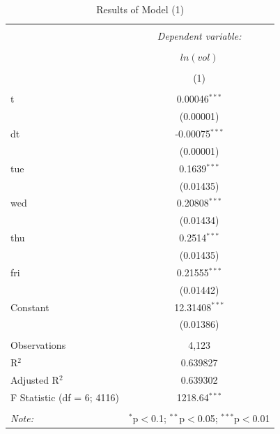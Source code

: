 \documentclass{article}
\begin{document}
\begin{table}[h!] \centering 
      \caption{Results of Model (1)} 
      \label{tab1} 
      \begin{tabular}{@{\extracolsep{5pt}}lc} 
          \\[-1.8ex]\hline 
          \hline \\[-1.8ex] 
           & \multicolumn{1}{c}{\textit{Dependent variable:}} \\ 
          \\[-1.8ex] & \multicolumn{1}{c}{$ln(vol)$} \\ 
          \\[-1.8ex] & (1) \\ 
          \hline \\[-1.8ex] 
           t & 0.00046$^{***}$ \\ 
            & (0.00001) \\ 
           dt & -0.00075$^{***}$  \\ 
            & (0.00001)  \\ 
           tue & 0.1639$^{***}$  \\ 
            & (0.01435) \\ 
           wed & 0.20808$^{***}$  \\ 
            & (0.01434)  \\ 
           thu & 0.2514$^{***}$  \\ 
            & (0.01435)  \\ 
           fri & 0.21555$^{***}$  \\ 
            & (0.01442)  \\ 
           Constant & 12.31408$^{***}$  \\ 
            & (0.01386)  \\ 
          \hline \\[-1.8ex] 
          Observations & 4,123  \\ 
          R$^{2}$ & 0.639827  \\ 
          Adjusted R$^{2}$ & 0.639302 \\ 
          F Statistic (df = 6; 4116) & 1218.64$^{***}$  \\ 
          \hline 
          \hline \\[-1.8ex] 
          \textit{Note:}  & \multicolumn{1}{r}{$^{*}$p$<$0.1; $^{**}$p$<$0.05; $^{***}$p$<$0.01} \\ 
      \end{tabular} 
\end{table} 
\end{document}
